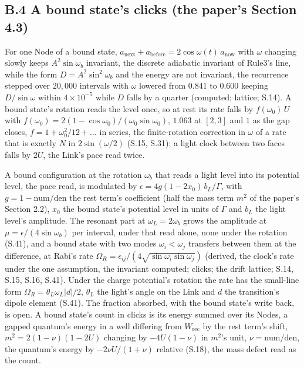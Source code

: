 \documentclass[pdflatex,sn-mathphys-num]{sn-jnl}
\newcommand{\num}{\mathrm{num}}
\newcommand{\den}{\mathrm{den}}
\newcommand{\anow}{a_{\mathrm{now}}}
\newcommand{\abefore}{a_{\mathrm{before}}}
\newcommand{\anext}{a_{\mathrm{next}}}
\theoremstyle{thmstyleone}
\begin{document}
\subsection*{B.4 A bound state's clicks (the paper's Section 4.3)}

For one Node of a bound state, $\anext + \abefore = 2\cos\omega(t)\,\anow$ with $\omega$ changing slowly keeps $A^2\sin\omega_b$ invariant, the discrete adiabatic invariant of Rule3's line, while the form $D = A^2\sin^2\omega_b$ and the energy are not invariant, the recurrence stepped over $20{,}000$ intervals with $\omega$ lowered from $0.841$ to $0.600$ keeping $D / \sin\omega$ within $4 \times 10^{-5}$ while $D$ falls by a quarter (computed; lattice; S.14). A bound state's rotation reads the level once, so at rest its rate falls by $f(\omega_0)\,U$ with $f(\omega_0) = 2(1 - \cos\omega_0) / (\omega_0\sin\omega_0)$, $1.063$ at $[2, 3]$ and $1$ as the gap closes, $f = 1 + \omega_0^2 / 12 + \dots$ in series, the finite-rotation correction in $\omega$ of a rate that is exactly $N$ in $2\sin(\omega / 2)$ (S.15, S.31); a light clock between two faces falls by $2U$, the Link's pace read twice.

A bound configuration at the rotation $\omega_b$ that reads a light level into its potential level, the pace read, is modulated by $\epsilon = 4g(1 - 2x_0)\,b_L / \Gamma$, with $g = 1 - \num / \den$ the rest term's coefficient (half the mass term $m^2$ of the paper's Section 2.2), $x_0$ the bound state's potential level in units of $\Gamma$ and $b_L$ the light level's amplitude. The resonant part at $\omega_L = 2\omega_b$ grows the amplitude at $\mu = \epsilon / (4\sin\omega_b)$ per interval, under that read alone, none under the rotation (S.41), and a bound state with two modes $\omega_i < \omega_j$ transfers between them at the difference, at Rabi's rate $\Omega_R = \epsilon_{ij} / (4\sqrt{\sin\omega_i\sin\omega_j})$ (derived, the clock's rate under the one assumption, the invariant computed; clicks; the drift lattice; S.14, S.15, S.16, S.41). Under the charge potential's rotation the rate has the small-line form $\Omega_R = \theta_L\omega_L|d| / 2$, $\theta_L$ the light's angle on the Link and $d$ the transition's dipole element (S.41). The fraction absorbed, with the bound state's write back, is open. A bound state's count in clicks is its energy summed over its Nodes, a gapped quantum's energy in a well differing from $W_{\mathrm{rec}}$ by the rest term's shift, $m^2 = 2(1 - \nu)(1 - 2U)$ changing by $-4U(1 - \nu)$ in $m^2$'s unit, $\nu = \num / \den$, the quantum's energy by $-2\nu U / (1 + \nu)$ relative (S.18), the mass defect read as the count.
\end{document}
